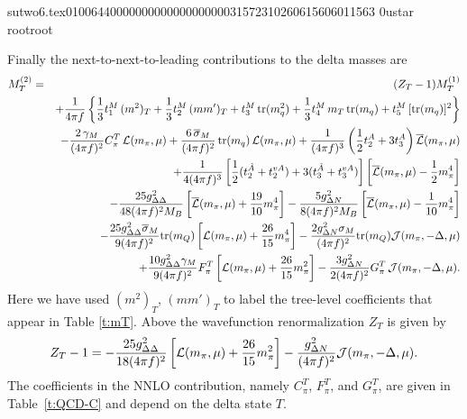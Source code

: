                                                                                                                                                                                                                                                                                       sutwo6.tex                                                                                          0100644 0000000 0000000 00000315723 10260615606 011563  0                                                                                                    ustar   root                            root                                                                                                                                                                                                                   \documentclass[prd,amssymb,amsmath,showpacs,nofootinbib,superscriptaddress]{revtex4}
\begin{document}
Finally the next-to-next-to-leading contributions to the delta masses are
\begin{eqnarray}
M_T^{(2)} &=& (Z_T - 1) M_T^{(1)} \notag \\ 
&& +
    \frac{1}{4 \pi f} \left\{ \frac{1}{3} t_1^M \, (m^2)_T 
      + \frac{1}{3} t_2^M \, (m m')_T 
      + t_3^M \, \text{tr}(m_q^2) 
      + \frac{1}{3} t_4^M \,  m_T  \, \text{tr} (m_q)
      + t_5^M \, [\text{tr} (m_q)]^2 \right\} \notag \\
&& -
    \frac{2 \,\gamma_M}{(4 \pi f)^2}  C_\pi^T \, {\mathcal L}(m_\pi,\mu) 
	+ \frac{6 \, {\overline{\sigma}}_M}{(4 \pi f)^2} \, \text{tr}(m_q) \,
		{\mathcal L}(m_\pi,\mu)
	+ \frac{1}{(4 \pi f )^3} \left( 
		\frac{1}{2} t^A_2  + 3 t^A_3 \right)
		{\overline{{\mathcal L}}} (m_\pi, \mu) \notag \\
	&&	+\frac{1}{4 (4 \pi f )^3} \left[ 
		\frac{1}{2} (t^{\tilde{A}}_2 + t_2^{vA}) 
		+ 3 (t^{\tilde{A}}_3  + t_3^{vA}) \right]
			\left[ {\overline{{\mathcal L}}} (m_\pi, \mu)
			- \frac{1}{2} m_\pi^4 \right] \notag \\
&& -
    \frac{25 g_{{\Delta}{\Delta}}^2}{48 (4\pi f)^2 M_B} 
     \left[
       {\overline{{\mathcal L}}}(m_\pi,\mu) + \frac{19}{10} m_\pi^4 \right]
      - \frac{5 g_{{\Delta} N}^2}{8 (4 \pi f)^2 M_B}  
       \left[
         {\overline{{\mathcal L}}}(m_\pi,\mu) - \frac{1}{10} m_\pi^4 \right] \notag \\
&& -  
    \frac{25 g_{{\Delta}{\Delta}}^2 {{\overline{\sigma}}_M}}{9 (4 \pi f)^2} \text{tr}(m_Q)
     \left[ {\mathcal L}(m_\pi,\mu) + \frac{26}{15} m_\pi^4 \right]
    - \frac{2 g_{{\Delta} N}^2 \sigma_M}{(4 \pi f)^2} \text{tr}(m_Q)
     {\mathcal J} (m_\pi,-{\Delta},\mu)\notag \\
&& +
    \frac{10 g_{{\Delta}{\Delta}}^2 \gamma_M}{9 (4 \pi f)^2} 
      F_\pi^T \left[ {\mathcal L}(m_\pi,\mu) + \frac{26}{15} m_\pi^2 \right]
      - \frac{3 g_{{\Delta} N}^2 }{2 (4 \pi f)^2} G_\pi^T  \, {\mathcal J} (m_\pi,-{\Delta},\mu)
\label{eq:MNNLO}
.\end{eqnarray}
Here we have used $(m^2)_T$, $(m m')_T$ to label the tree-level coefficients that
appear in Table \ref{t:mT}. 
Above the wavefunction renormalization $Z_T$ is given by
\begin{equation}
Z_T - 1 = - \frac{25 g_{{\Delta}{\Delta}}^2}{18 (4 \pi f)^2} 
           \left[ {\mathcal L}(m_\pi,\mu) + \frac{26}{15} m_\pi^2 \right]
          - \frac{g_{{\Delta} N}^2}{(4 \pi f)^2} {\mathcal J} (m_\pi,-{\Delta},\mu)
\label{eq:Z}
.\end{equation}
The coefficients in the NNLO contribution, namely $C_\pi^T$, $F_\pi^T$, and $G_\pi^T$, are given in 
Table~\ref{t:QCD-C} and depend on the delta state $T$.
\end{document}
